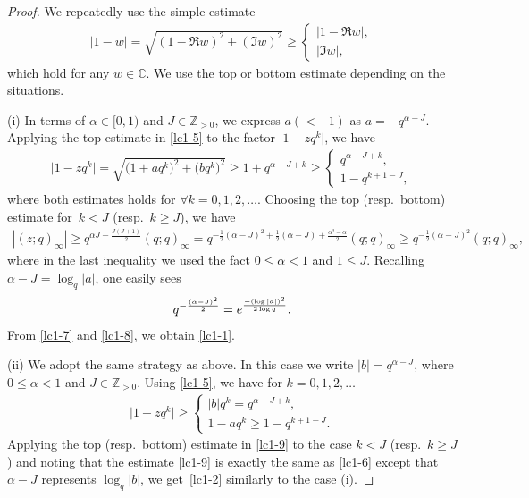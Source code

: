 \documentclass[11pt]{article}
\numberwithin{equation}{section}
\numberwithin{equation}{section}
\def\a{\alpha}
\def\C{\mathbb{C}}
\def\i{\infty}
\def\Z{\mathbb{Z}}
\begin{document}
\begin{proof}
 We repeatedly use the simple estimate
 \begin{align}
\label{lc1-5}
 |1-w|=\sqrt{(1-\Re w)^2+(\Im w)^2}\ge
 \begin{cases}
 |1-\Re w|,\\
 |\Im w|,
 \end{cases}
\end{align}
 which hold for any $w\in\C$. We use the top or bottom estimate depending on the situations.

 (i) In terms of $\a\in [0,1)$ and $J\in\Z_{>0}$, we express $a(<-1)$
 as $a=-q^{\a-J}$.
 Applying the top estimate in \eqref{lc1-5}
 to the factor $\big|1-z q^k\big|$, we have
 \begin{align}
 \label{lc1-6}
 \big|1-z q^k\big|=\sqrt{\big(1+aq^{k}\big)^2+\big(bq^k\big)^2}
 \ge 1+q^{\a-J+k}
 \ge
 \begin{cases}
 q^{\a-J+k},
 \\
 1-q^{k+1-J},
 \end{cases}
 \end{align}
 where both estimates holds for $\forall k=0,1,2,\dots$. Choosing the top (resp.\ bottom) estimate for~${k<J}$ (resp.\ $k\ge J$), we have
 \begin{align}
 \label{lc1-7}
 |(z;q)_\i|\ge q^{\a J-\frac{J(J+1)}{2}}(q;q)_{\i}
 =
 q^{-\frac{1}{2}(\a-J)^2+\frac{1}{2}(\a-J)
 +\frac{\a^2-\a}{2}}(q;q)_{\i}
 \ge
 q^{-\frac{1}{2}(\a-J)^2}(q;q)_{\i},
 \end{align}
 where in the last inequality we used the fact
 $0\le\a<1$ and $1\le J$. Recalling $\a-J=\log_q|a|$,
 one easily sees
 \begin{align}
 \label{lc1-8}
 q^{-\frac{(\a-J)^2}{2}}=
 {\rm e}^{\frac{-(\log |a|)^2}{2\log q}}.
 \end{align}
 From \eqref{lc1-7} and \eqref{lc1-8},
 we obtain \eqref{lc1-1}.

 (ii)
 We adopt the same strategy as above.
 In this case we write $|b|=q^{\a-J}$, where
 $0\le \a<1$ and $J\in\Z_{>0}$. Using \eqref{lc1-5},
 we have for $k=0,1,2,\dots$
 \begin{align}
 \label{lc1-9}
 \big|1-z q^k\big|
 \ge
 \begin{cases}
 |b|q^{k}=q^{\a-J+k},
 \\
 1-aq^k\ge 1-q^{k+1-J}.
 \end{cases}
 \end{align}
 Applying the top (resp.\ bottom) estimate in \eqref{lc1-9} to the case $k<J$ (resp.\ $k\ge J$) and noting that the estimate \eqref{lc1-9}
 is exactly the same as \eqref{lc1-6} except
 that $\a-J$ represents $\log_q|b|$, we get~\eqref{lc1-2} similarly to the case
 (i).


\end{proof}
\end{document}

